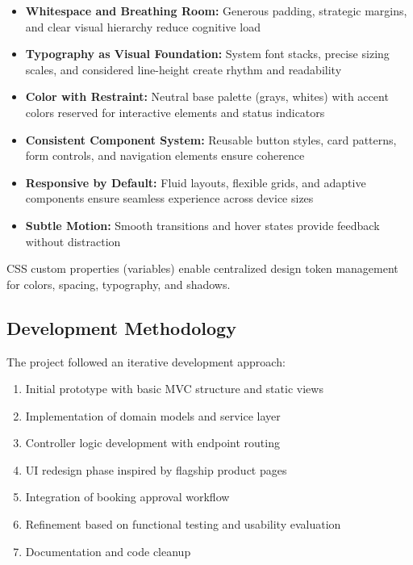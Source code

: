 \documentclass[12pt,a4paper]{article}
\begin{document}
\begin{itemize}[leftmargin=*]
    \item \textbf{Whitespace and Breathing Room:} Generous padding, strategic margins, and clear visual hierarchy reduce cognitive load
    
    \item \textbf{Typography as Visual Foundation:} System font stacks, precise sizing scales, and considered line-height create rhythm and readability
    
    \item \textbf{Color with Restraint:} Neutral base palette (grays, whites) with accent colors reserved for interactive elements and status indicators
    
    \item \textbf{Consistent Component System:} Reusable button styles, card patterns, form controls, and navigation elements ensure coherence
    
    \item \textbf{Responsive by Default:} Fluid layouts, flexible grids, and adaptive components ensure seamless experience across device sizes
    
    \item \textbf{Subtle Motion:} Smooth transitions and hover states provide feedback without distraction
\end{itemize}

CSS custom properties (variables) enable centralized design token management for colors, spacing, typography, and shadows.

\subsection{Development Methodology}

The project followed an iterative development approach:

\begin{enumerate}[leftmargin=*]
    \item Initial prototype with basic MVC structure and static views
    \item Implementation of domain models and service layer
    \item Controller logic development with endpoint routing
    \item UI redesign phase inspired by flagship product pages
    \item Integration of booking approval workflow
    \item Refinement based on functional testing and usability evaluation
    \item Documentation and code cleanup
\end{enumerate}
\end{document}

